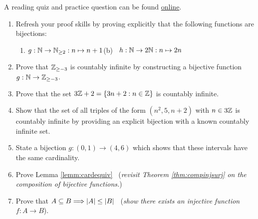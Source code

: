 

\begin{exercises}{}{}
	A reading quiz and practice question can be found \href{http://www.math.uci.edu/~ndonalds/math13/selftest/8-1-cantor.html}{online}.
	
	\begin{enumerate}
	  \item Refresh your proof skills by proving explicitly that the following functions are bijections:
	  \begin{enumerate}
	    \item $g:\mathbb{N}\to\mathbb{N}_{\ge 2}:n\mapsto n+1$\qquad\qquad (b) \ $h:\mathbb{N}\to 2\mathbb{N}:n\mapsto 2n$
	  \end{enumerate}
  
  
		\item Prove that $\mathbb{Z}_{\ge -3}$ is countably infinite by constructing a bijective function $g:\mathbb{N}\to\mathbb{Z}_{\ge -3}$.
		
		
		\item Prove that the set $3\mathbb{Z}+2=\{3n+2:n\in\mathbb{Z}\}$ is countably infinite.
		
	
		\item Show that the set of all triples of the form $(n^2,5,n+2)$ with $n\in 3\mathbb{Z}$ is countably infinite by providing an explicit bijection with a known countably infinite set.
		
		\item\label{exs:easyintervalcard} State a bijection $g:(0,1)\to (4,6)$ which shows that these intervals have the same cardinality.
		
		\goodbreak

	
		\item Prove Lemma \ref{lemm:cardequiv} \ (\emph{revisit Theorem \ref{thm:compinjsurj} on the composition of bijective functions.})
		
		
		\item Prove that $A\subseteq B\Longrightarrow \left| A\right|\le\left| B\right|$ \ (\emph{show there exists an injective function $f:A\to B$}).
	

\end{enumerate}
\end{exercises}
